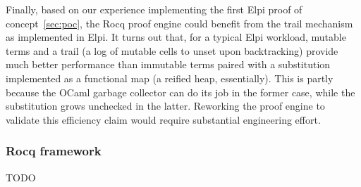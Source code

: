 \documentclass[a4paper, 11pt]{book}
\begin{document}
Finally, based on our experience implementing the first Elpi proof of
concept~\cref{sec:poc}, the Rocq proof engine could benefit from the trail
mechanism as implemented in Elpi. It turns out that, for a typical Elpi
workload, mutable terms and a trail (a log of mutable cells to unset upon
backtracking) provide much better performance than immutable terms paired with
a substitution implemented as a functional map (a reified heap, essentially).
This is partly because the OCaml garbage collector can do its job in the former
case, while the substitution grows unchecked in the latter. Reworking the proof
engine to validate this efficiency claim would require substantial engineering
effort.

\subsubsection{Rocq framework}

TODO

\nocite{*}
\printbibliography[title={Our Bibliography}, keyword=me]
\printbibliography[title={Bibliography}, keyword=they]
\end{document}

